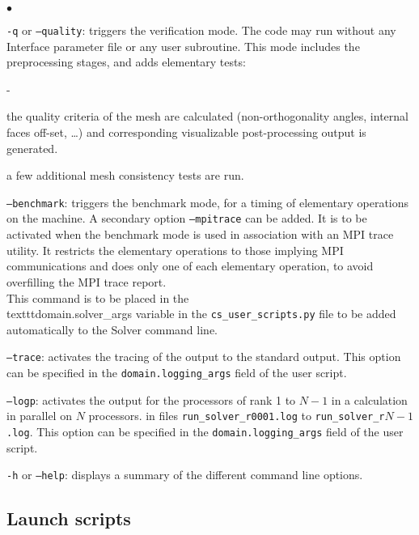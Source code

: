 {{{{\begin{list}{$\bullet$}{}
\item \texttt{-q} or \texttt{--quality}: triggers the verification mode.
The code may run without any Interface parameter file or any user subroutine.
This mode includes the preprocessing stages, and adds elementary tests:\\
\begin{list}{-}{}
\item the quality criteria of the mesh are calculated (non-orthogonality angles,
internal faces off-set, \ldots) and corresponding
visualizable post-processing output is generated.\\
\item a few additional mesh consistency tests are run.\\
\end{list}

\item \texttt{--benchmark}: triggers the benchmark mode, for a timing
of elementary operations on the machine. A secondary option
\texttt{--mpitrace} can be added. It is to be activated when the benchmark mode
is used in association with an MPI trace utility. It restricts the elementary
operations to those implying MPI communications and does only one of each
elementary operation, to avoid overfilling the MPI trace report.\\
This command is to be placed in the \\texttt{domain.solver\_args} variable
in the \texttt{cs\_user\_scripts.py} file to be added automatically to the
Solver command line.

\item \texttt{--trace}: activates the tracing of the output to the standard output.
This option can be specified in the \texttt{domain.logging\_args} field
of the user script.

\item \texttt{--logp}: activates the output for the
processors of rank 1 to $N-1$ in a calculation in parallel on $N$ processors.
in files \texttt{run\_solver\_r0001.log} to \texttt{run\_solver\_r$N-1$.log}.
This option can be specified in the \texttt{domain.logging\_args} field
of the user script.

\item \texttt{-h} or \texttt{--help}: displays a summary of the different
command line options.
\end{list}

\subsection{Launch scripts}
\label{sec:prg_runcase}%

}}}}
